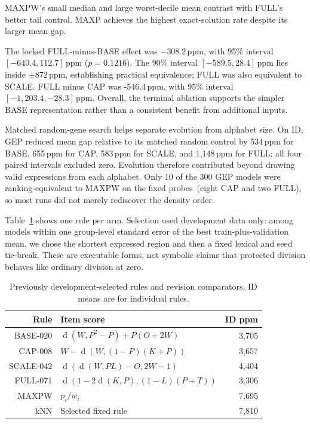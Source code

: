 \documentclass[conference]{IEEEtran}
\newcommand{\ppm}{\,\mathrm{ppm}}
\newcommand{\pdiv}{\operatorname{d}}
\begin{document}
MAXPW's small median and large worst-decile mean contrast with FULL's better tail control. MAXP achieves the highest exact-solution rate despite its larger mean gap.

The locked FULL-minus-BASE effect was $-308.2\ppm$, with 95\% interval $[-640.4,112.7]\ppm$ ($p=0.1216$). The 90\% interval $[-589.5,28.4]\ppm$ lies inside $\pm872\ppm$, establishing practical equivalence; FULL was also equivalent to SCALE. FULL minus CAP was -546.4$\ppm$, with 95\% interval $[-1,203.4,-28.3]\ppm$. Overall, the terminal ablation supports the simpler BASE representation rather than a consistent benefit from additional inputs.

Matched random-gene search helps separate evolution from alphabet size. On ID, GEP reduced mean gap relative to its matched random control by 534$\ppm$ for BASE, 655$\ppm$ for CAP, 583$\ppm$ for SCALE, and 1,148$\ppm$ for FULL; all four paired intervals excluded zero. Evolution therefore contributed beyond drawing valid expressions from each alphabet. Only 10 of the 300 GEP models were ranking-equivalent to MAXPW on the fixed probes~(eight CAP and two FULL), so most runs did not merely rediscover the density order.

Table~\ref{table:Expressions} shows one rule per arm. Selection used development data only: among models within one group-level standard error of the best train-plus-validation mean, we chose the shortest expressed region and then a fixed lexical and seed tie-break. These are executable forms, not symbolic claims that protected division behaves like ordinary division at zero.

\begin{table}[htb!]
\caption{Previously development-selected rules and revision comparators. ID means are for individual rules.}
\label{table:Expressions}
\centering
\begin{tabular}{rlr}
\toprule
\textbf{Rule} & \textbf{Item score} & \textbf{ID ppm} \\
\midrule
BASE-020 & $\pdiv(W,P^2-P)+P(O+2W)$ & 3,705 \\
CAP-008 & $W-\pdiv(W,(1-P)(K+P))$ & 3,657 \\
SCALE-042 & $\pdiv(\pdiv(W,PL)-O,2W-1)$ & 4,404 \\
FULL-071 & $\pdiv(1-2\pdiv(K,P),(1-L)(P+T))$ & 3,306 \\
MAXPW & $p_i/w_i$ & 7,695 \\
kNN & Selected fixed rule & 7,810 \\
\bottomrule
\end{tabular}
\end{table}
\end{document}

